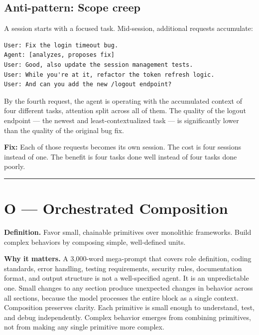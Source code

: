 \documentclass[
  a4paper,
  DIV=11,
  numbers=noendperiod]{scrreprt}
\begin{document}
\subsection{Anti-pattern: Scope creep}\label{anti-pattern-scope-creep}

A session starts with a focused task. Mid-session, additional requests
accumulate:

\begin{verbatim}
User: Fix the login timeout bug.
Agent: [analyzes, proposes fix]
User: Good, also update the session management tests.
User: While you're at it, refactor the token refresh logic.
User: And can you add the new /logout endpoint?
\end{verbatim}

By the fourth request, the agent is operating with the accumulated
context of four different tasks, attention split across all of them. The
quality of the logout endpoint --- the newest and least-contextualized
task --- is significantly lower than the quality of the original bug
fix.

\textbf{Fix:} Each of those requests becomes its own session. The cost
is four sessions instead of one. The benefit is four tasks done well
instead of four tasks done poorly.

\begin{center}\rule{0.5\linewidth}{0.5pt}\end{center}

\section{O --- Orchestrated
Composition}\label{o-orchestrated-composition}

\textbf{Definition.} Favor small, chainable primitives over monolithic
frameworks. Build complex behaviors by composing simple, well-defined
units.

\textbf{Why it matters.} A 3,000-word mega-prompt that covers role
definition, coding standards, error handling, testing requirements,
security rules, documentation format, and output structure is not a
well-specified agent. It is an unpredictable one. Small changes to any
section produce unexpected changes in behavior across all sections,
because the model processes the entire block as a single context.
Composition preserves clarity. Each primitive is small enough to
understand, test, and debug independently. Complex behavior emerges from
combining primitives, not from making any single primitive more complex.
\end{document}
